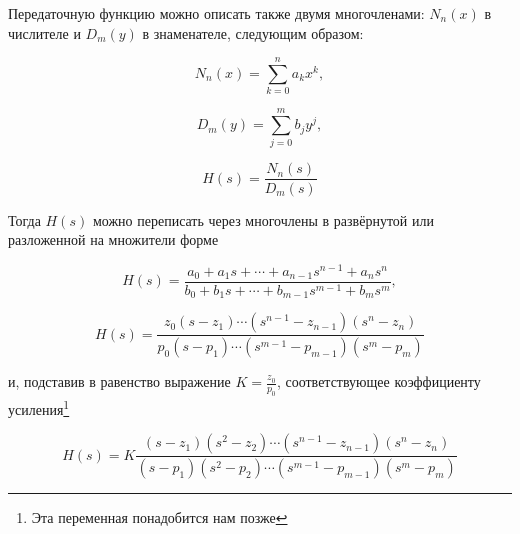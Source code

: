 \documentclass[a4paper, 10pt, final]{article} %
\begin{document}
    \noindent Передаточную функцию можно описать также двумя многочленами: $N_n(x)$ в числителе и $D_m(y)$ в знаменателе, следующим образом:
    \begin{figure}[H]
        \centering
        \begin{minipage}[b]{.3\linewidth}
            \centering
            \[
                N_n(x) = \sum^{n}_{k=0} a_k x^k \mathrm{,}
            \]
        \end{minipage}
        \begin{minipage}[b]{.3\linewidth}
            \centering
            \[
                D_m(y) = \sum^{m}_{j=0} b_j y^j \mathrm{,}
            \]
        \end{minipage}
        \begin{minipage}[b]{.3\linewidth}
            \centering
            \[
                H(s) = \frac{N_n(s)}{D_m(s)}
            \]
        \end{minipage}
    \end{figure}
    \noindent Тогда $H(s)$ можно переписать через многочлены в развёрнутой или разложенной на множители форме
    \begin{figure}[H]
        \centering
        \begin{minipage}[b]{.45\linewidth}
            \centering
            \[
                H(s) = \frac{a_0 + a_1 s + \dotsm + a_{n-1} s^{n-1} + a_n s^n}{b_0 + b_1 s + \dotsm + b_{m-1} s^{m-1} + b_m s^m} \mathrm{,}
            \]
        \end{minipage}
        \hspace{0.04\linewidth}
        \begin{minipage}[b]{.45\linewidth}
            \centering
            \[
                H(s) = \frac{z_0 \left(s - z_1\right) \dotsm \left(s^{n-1} - z_{n-1}\right) \left(s^n - z_n\right)}{p_0 \left(s - p_1\right) \dotsm \left(s^{m-1} - p_{m-1}\right) \left(s^m - p_m\right)}
            \]
        \end{minipage}
    \end{figure}
    \noindent и, подставив в равенство выражение $K = \frac{z_0}{p_0}$, соответствующее коэффициенту усиления\footnote{Эта переменная понадобится нам позже} 
    \begin{figure}[H]
        \centering
        \[
            H(s) = K \frac{\left(s - z_1\right) \left(s^2 - z_2\right) \dotsm \left(s^{n-1} - z_{n-1}\right) \left(s^n - z_n\right)}{\left(s - p_1\right) \left(s^2 - p_2\right) \dotsm \left(s^{m-1} - p_{m-1}\right) \left(s^m - p_m\right)}
        \]
    \end{figure}
\end{document}
